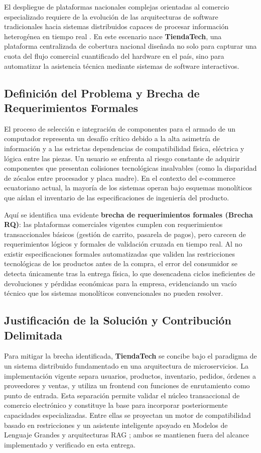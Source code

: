 \documentclass[12pt]{article}
\begin{document}
    El despliegue de plataformas nacionales complejas orientadas al comercio especializado requiere de la evolución de las arquitecturas de software tradicionales hacia sistemas distribuidos capaces de procesar información heterogénea en tiempo real \cite{vinayababu2025revolutionizing}. En este escenario nace \textbf{TiendaTech}, una plataforma centralizada de cobertura nacional diseñada no solo para capturar una cuota del flujo comercial cuantificado del hardware en el país, sino para automatizar la asistencia técnica mediante sistemas de software interactivos.

    \subsection{Definición del Problema y Brecha de Requerimientos Formales}
    El proceso de selección e integración de componentes para el armado de un computador representa un desafío crítico debido a la alta asimetría de información y a las estrictas dependencias de compatibilidad física, eléctrica y lógica entre las piezas. Un usuario se enfrenta al riesgo constante de adquirir componentes que presentan colisiones tecnológicas insalvables (como la disparidad de zócalos entre procesador y placa madre). En el contexto del e-commerce ecuatoriano actual, la mayoría de los sistemas operan bajo esquemas monolíticos que aíslan el inventario de las especificaciones de ingeniería del producto.

    Aquí se identifica una evidente \textbf{brecha de requerimientos formales (Brecha RQ)}: las plataformas comerciales vigentes cumplen con requerimientos transaccionales básicos (gestión de carrito, pasarela de pagos), pero carecen de requerimientos lógicos y formales de validación cruzada en tiempo real. Al no existir especificaciones formales automatizadas que validen las restricciones tecnológicas de los productos antes de la compra, el error del consumidor se detecta únicamente tras la entrega física, lo que desencadena ciclos ineficientes de devoluciones y pérdidas económicas para la empresa, evidenciando un vacío técnico que los sistemas monolíticos convencionales no pueden resolver.

    \subsection{Justificación de la Solución y Contribución Delimitada}
    Para mitigar la brecha identificada, \textbf{TiendaTech} se concibe bajo el paradigma de un sistema distribuido fundamentado en una arquitectura de microservicios. La implementación vigente separa usuarios, productos, inventario, pedidos, órdenes a proveedores y ventas, y utiliza un frontend con funciones de enrutamiento como punto de entrada. Esta separación permite validar el núcleo transaccional de comercio electrónico y constituye la base para incorporar posteriormente capacidades especializadas. Entre ellas se proyectan un motor de compatibilidad basado en restricciones \cite{velten2025solutions} y un asistente inteligente apoyado en Modelos de Lenguaje Grandes y arquitecturas RAG \cite{munson2025review}; ambos se mantienen fuera del alcance implementado y verificado en esta entrega.
\end{document}
